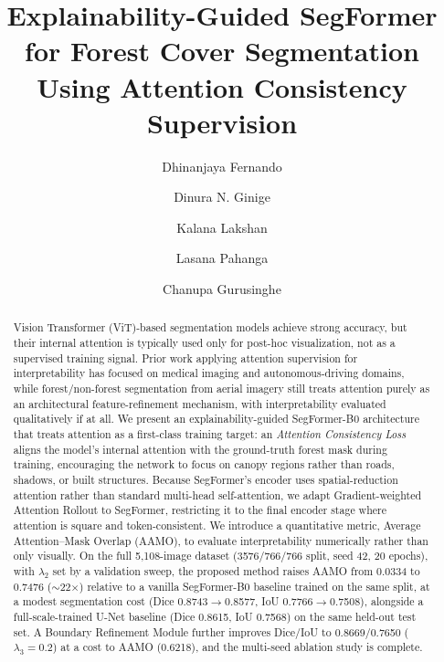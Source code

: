 \documentclass[sigconf,review]{acmart}
\begin{document}
\title{Explainability-Guided SegFormer for Forest Cover Segmentation Using Attention Consistency Supervision}

\author{Dhinanjaya Fernando}

\author{Dinura N. Ginige}

\author{Kalana Lakshan}

\author{Lasana Pahanga}

\author{Chanupa Gurusinghe}

\renewcommand{\shortauthors}{Fernando, Ginige, Lakshan, Pahanga, and Gurusinghe}

\begin{abstract}
Vision Transformer (ViT)-based segmentation models achieve strong accuracy,
but their internal attention is typically used only for post-hoc
visualization, not as a supervised training signal. Prior work applying
attention supervision for interpretability has focused on medical imaging
and autonomous-driving domains, while forest/non-forest segmentation from
aerial imagery still treats attention purely as an architectural
feature-refinement mechanism, with interpretability evaluated qualitatively
if at all. We present an explainability-guided SegFormer-B0 architecture
that treats attention as a first-class training target: an
\emph{Attention Consistency Loss} aligns the model's internal attention
with the ground-truth forest mask during training, encouraging the network
to focus on canopy regions rather than roads, shadows, or built structures.
Because SegFormer's encoder uses spatial-reduction attention rather than
standard multi-head self-attention, we adapt Gradient-weighted Attention
Rollout to SegFormer, restricting it to the final encoder stage where
attention is square and token-consistent. We introduce a quantitative
metric, Average Attention--Mask Overlap (AAMO), to evaluate interpretability
numerically rather than only visually. On the full 5{,}108-image dataset
(3576/766/766 split, seed 42, 20 epochs), with $\lambda_2$ set by a
validation sweep, the
proposed method raises AAMO from 0.0334 to 0.7476 ($\sim$22$\times$) relative
to a vanilla SegFormer-B0 baseline trained on the same split, at a modest
segmentation cost (Dice 0.8743$\to$0.8577, IoU 0.7766$\to$0.7508), alongside a
full-scale-trained U-Net baseline (Dice 0.8615, IoU 0.7568) on the same
held-out test set. A Boundary Refinement Module further improves Dice/IoU
to 0.8669/0.7650 ($\lambda_3{=}0.2$) at a cost to AAMO (0.6218), and the
multi-seed ablation study is complete.
\end{abstract}
\end{document}
